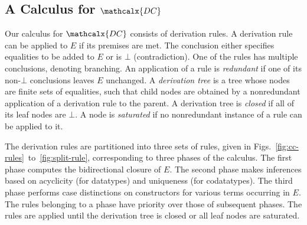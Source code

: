 \documentclass[smallcondensed,draft]{svjour3}
\newcommand\Sig{\mathrm{\Sigma}}
\newcommand\const[1]{\textsf{#1}}
\renewcommand{\vec}[1]{\bar #1}
\newcommand{\Ec}{E}
\newcommand{\tEc}{\Terms(\Ec)}
\newcommand{\thD}{\mathcalx{DC}}
\newcommand\Terms{\mathcalx{T}}
\newcommand\negvthinspace{\kern-0.083333em}
\begin{document}
\subsection{A Calculus for $\thD$}
\label{sec:calculus-for-dc}



Our calculus for $\thD$ consists of derivation rules.
A derivation rule can be applied to $\Ec$ if %
its premises are met.
The conclusion either specifies equalities to be added to $\Ec$
or is $\bot$ (contradiction).
One of the rules has multiple conclusions, %
denoting branching.
%
An application of a rule is \emph{redundant} if one of its non-$\bot$
conclusions leaves $\Ec$ unchanged.
A \emph{derivation tree} is a %
tree whose nodes are finite sets of
equalities, such that child nodes are obtained by a nonredundant application of a
derivation rule to the parent. A derivation tree is \emph{closed} if all of
its leaf nodes are $\bot.$ A node is \emph{saturated} if no nonredundant
instance of a rule can be applied to it.

The derivation rules are partitioned into three sets of rules, given in
Figs.\ \ref{fig:cc-rules}~to~\ref{fig:split-rule}, corresponding to three
phases of the calculus. The first phase computes the bidirectional closure of $\Ec.$ The second
phase makes inferences based on acyclicity (for datatypes) and uniqueness
(for codatatypes).
The third phase performs case distinctions on constructors for
various terms occurring in $\Ec.$
%
The rules belonging to a phase have priority over those of %
subsequent
phases. The rules are applied until the derivation tree is closed or all leaf nodes
are saturated.

\end{document}
